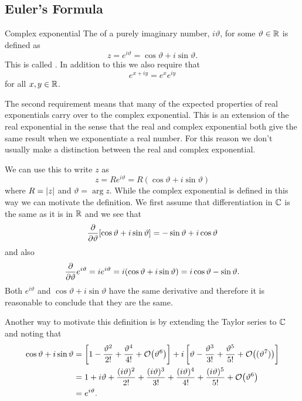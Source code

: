 \documentclass{article}
\begin{document}
    \subsection{Euler's Formula}
    \begin{definition}{Complex exponential}{}
        The  of a purely imaginary number, \(i\vartheta\), for some \(\vartheta\in\mathbb{R}\) is defined as
        \[z = e^{i\vartheta} = \cos\vartheta + i\sin\vartheta.\]
        This is called .
        In addition to this we also require that
        \[e^{x + iy} = e^xe^{iy}\]
        for all \(x, y\in\mathbb{R}\).
    \end{definition}
    The second requirement means that many of the expected properties of real exponentials carry over to the complex exponential.
    This is an extension of the real exponential in the sense that the real and complex exponential both give the same result when we exponentiate a real number.
    For this reason we don't usually make a distinction between the real and complex exponential.
    
    We can use this to write \(z\) as
    \[z = Re^{i\vartheta} = R(\cos\vartheta + i\sin\vartheta)\]
    where \(R = \abs{z}\) and \(\vartheta = \arg z\).
    While the complex exponential is defined in this way we can motivate the definition.
    We first assume that differentiation in \(\mathbb{C}\) is the same as it is in \(\mathbb{R}\) and we see that
    \[\pdv{\vartheta}[\cos\vartheta + i\sin\vartheta] = -\sin\vartheta + i\cos\vartheta\]
    and also
    \[\pdv{\vartheta}e^{i\vartheta} = ie^{i\vartheta} = i (\cos\vartheta + i\sin\vartheta) = i\cos\vartheta - \sin\vartheta.\]
    Both \(e^{i\vartheta}\) and \(\cos\vartheta + i\sin\vartheta\) have the same derivative and therefore it is reasonable to conclude that they are the same.
    
    Another way to motivate this definition is by extending the Taylor series to \(\mathbb{C}\) and noting that
    \begin{align*}
        \cos\vartheta + i\sin\vartheta &= \left[1 - \frac{\vartheta^2}{2!} + \frac{\vartheta^4}{4!} + \order{\vartheta^6}\right] + i\left[\vartheta - \frac{\vartheta^3}{3!} + \frac{\vartheta^5}{5!} + \order{(\vartheta^7)}\right]\\
        &= 1 + i\vartheta + \frac{(i\vartheta)^2}{2!} + \frac{(i\vartheta)^3}{3!} + \frac{(i\vartheta)^4}{4!} + \frac{(i\vartheta)^5}{5!} + \order{\vartheta^6}\\
        &= e^{i\vartheta}.
    \end{align*}
    
\end{document}
